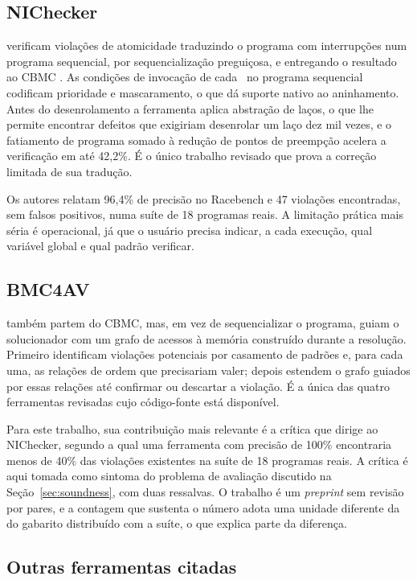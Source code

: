 \subsection{NIChecker}

 verificam violações de atomicidade traduzindo o programa
com interrupções num programa sequencial, por sequencialização preguiçosa, e
entregando o resultado ao CBMC \cite{lazycseq,cbmc}. As condições de invocação
de cada \isr\ no programa sequencial codificam prioridade e mascaramento, o que
dá suporte nativo ao aninhamento. Antes do desenrolamento a ferramenta aplica
abstração de laços, o que lhe permite encontrar defeitos que exigiriam
desenrolar um laço dez mil vezes, e o fatiamento de programa somado à redução
de pontos de preempção acelera a verificação em até 42,2\%. É o único trabalho
revisado que prova a correção limitada de sua tradução.

Os autores relatam 96,4\% de precisão no Racebench e 47 violações encontradas,
sem falsos positivos, numa suíte de 18 programas reais. A limitação prática mais
séria é operacional, já que o usuário precisa indicar, a cada execução, qual
variável global e qual padrão verificar.

\subsection{BMC4AV}

 também partem do CBMC, mas, em vez de sequencializar o
programa, guiam o solucionador com um grafo de acessos à memória construído
durante a resolução. Primeiro identificam violações potenciais por casamento de
padrões e, para cada uma, as relações de ordem que precisariam valer; depois
estendem o grafo guiados por essas relações até confirmar ou descartar a
violação. É a única das quatro ferramentas revisadas cujo código-fonte está
disponível.

Para este trabalho, sua contribuição mais relevante é a crítica que dirige ao
NIChecker, segundo a qual uma ferramenta
com precisão de 100\% encontraria menos de 40\% das violações existentes na
suíte de 18 programas reais. A crítica é aqui tomada como sintoma do problema
de avaliação discutido na Seção~\ref{sec:soundness}, com duas ressalvas. O
trabalho é um \textit{preprint} sem revisão por pares, e a contagem que sustenta
o número adota uma unidade diferente da do gabarito distribuído com a suíte, o
que explica parte da diferença.

\subsection{Outras ferramentas citadas}

